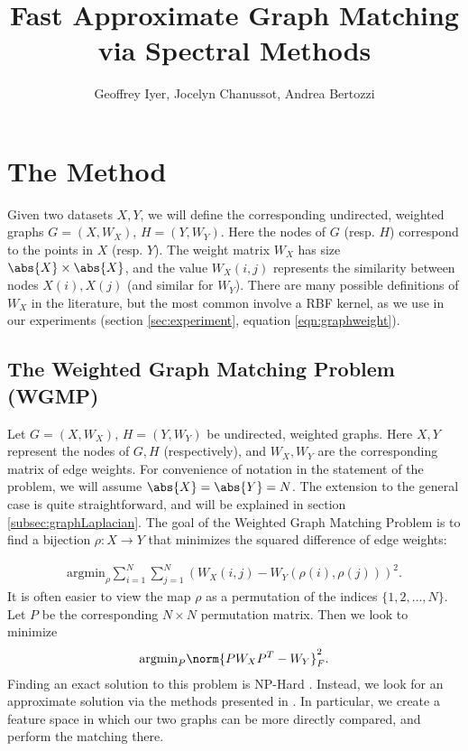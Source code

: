\documentclass{article}[11pt]
\begin{document}
\title{Fast Approximate Graph Matching via Spectral Methods}
\author{Geoffrey Iyer, Jocelyn Chanussot, Andrea Bertozzi}
\maketitle

\section{The Method}
\label{sec:method}
Given two datasets $X,Y$, we will define the corresponding undirected, weighted
graphs $G = (X,W_X)$, $H = (Y,W_Y)$. Here the nodes of $G$ (resp. $H$)
correspond to the points in $X$ (resp. $Y$). The weight matrix $W_X$ has size
$\abs{X}\times\abs{X}$, and the value $W_X(i,j)$ represents the similarity
between nodes $X(i),X(j)$ (and similar for $W_Y$). There are many possible
definitions of $W_X$ in the literature, but the most common involve a RBF
kernel, as we use in our experiments (section \ref{sec:experiment}, equation
\ref{eqn:graphweight}).

\subsection{The Weighted Graph Matching Problem (WGMP)}
\label{subsec:WGMP}
Let $G = (X,W_X)$, $H = (Y,W_Y)$ be undirected, weighted graphs. Here $X, Y$
represent the nodes of $G, H$ (respectively), and $W_X,W_Y$ are the corresponding
matrix of edge weights. For convenience of notation in the statement of the
problem, we will assume $\abs{X} = \abs{Y} = N$. The extension to the general
case is quite straightforward, and will be explained in section
\ref{subsec:graphLaplacian}. The goal of the Weighted Graph Matching Problem is
to find a bijection $\rho:X \to Y$ that minimizes the squared difference of edge
weights:

\begin{align}
  \text{argmin}_{\rho}\sum_{i=1}^N\sum_{j=1}^N \left( W_X(i,j) - W_Y(\rho(i),\rho(j)) \right)^2.
\end{align}
It is often easier to view the map $\rho$ as a permutation of the
indices $\{1,2,\ldots,N\}$. Let $P$ be the corresponding $N \times N$
permutation matrix. Then we look to minimize
\begin{align}
  \label{eqn:WGMPperm} \text{argmin}_{P}\norm{PW_XP^T - W_Y}^2_F.
\end{align}
Finding an exact solution to this problem is NP-Hard \cite{Arvind2012}. Instead,
we look for an approximate solution via the methods presented in
\cite{Umeyama1988,Knossow2009}. In particular, we create a feature space in
which our two graphs can be more directly compared, and perform the matching
there.
\end{document}
